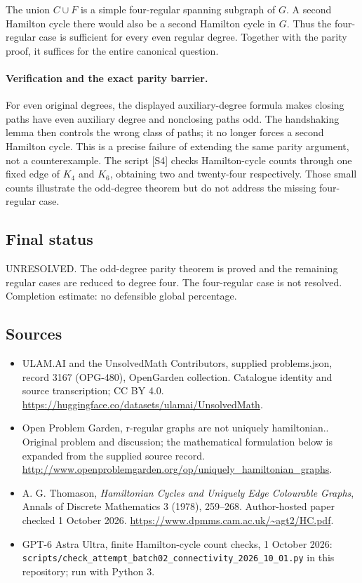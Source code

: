 \documentclass[11pt,a4paper]{article}
\begin{document}
The union $C\cup F$ is a simple four-regular spanning subgraph of
$G$. A second Hamilton cycle there would also be a second Hamilton
cycle in $G$. Thus the four-regular case is sufficient for every
even regular degree. Together with the parity proof, it suffices for
the entire canonical question.

\paragraph{Verification and the exact parity barrier.}
For even original degrees, the displayed auxiliary-degree formula
makes closing paths have even auxiliary degree and nonclosing paths
odd. The handshaking lemma then controls the wrong class of paths;
it no longer forces a second Hamilton cycle. This is a precise failure
of extending the same parity argument, not a counterexample. The
script [S4] checks Hamilton-cycle counts through one fixed edge of
$K_4$ and $K_6$, obtaining two and twenty-four respectively. Those
small counts illustrate the odd-degree theorem but do not address
the missing four-regular case.

\subsection{Final status}
UNRESOLVED. The odd-degree parity theorem is proved and the remaining
regular cases are reduced to degree four. The four-regular case is
not resolved. Completion estimate: no defensible global percentage.

\subsection{Sources}
\begin{itemize}
\item[S1] ULAM.AI and the UnsolvedMath Contributors, supplied problems.json, record 3167 (OPG-480), OpenGarden collection. Catalogue identity and source transcription; CC BY 4.0.
\url{https://huggingface.co/datasets/ulamai/UnsolvedMath}.
\item[S2] Open Problem Garden, r-regular graphs are not uniquely hamiltonian.. Original problem and discussion; the mathematical formulation below is expanded from the supplied source record.
\url{http://www.openproblemgarden.org/op/uniquely_hamiltonian_graphs}.
\item[S3] A. G. Thomason, \emph{Hamiltonian Cycles and Uniquely Edge Colourable Graphs}, Annals of Discrete Mathematics 3 (1978), 259--268. Author-hosted paper checked 1 October 2026.
\url{https://www.dpmms.cam.ac.uk/~agt2/HC.pdf}.
\item[S4] GPT-6 Astra Ultra, finite Hamilton-cycle count checks, 1 October 2026: \texttt{scripts/check\_attempt\_batch02\_connectivity\_2026\_10\_01.py} in this repository; run with Python 3.
\end{itemize}
\end{document}
